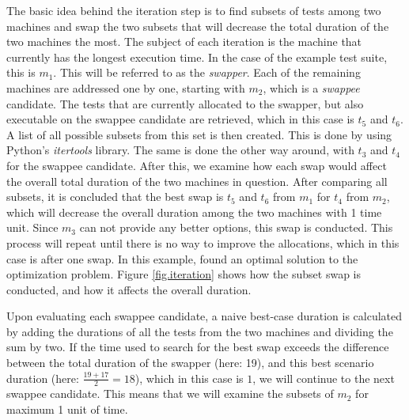 The basic idea behind the iteration step is to find subsets of tests among two machines and swap the two subsets that will decrease the total duration of the two machines the most. The subject of each iteration is the machine that currently has the longest execution time. In the case of the example test suite, this is $m_{1}$. This will be referred to as the \emph{swapper}. Each of the remaining machines are addressed one by one, starting with $m_{2}$, which is a \emph{swappee} candidate. The tests that are currently allocated to the swapper, but also executable on the swappee candidate are retrieved, which in this case is $t_{5}$ and $t_{6}$. A list of all possible subsets from this set is then created. This is done by using Python's \emph{itertools} library. The same is done the other way around, with $t_{3}$ and $t_{4}$ for the swappee candidate. After this, we examine how each swap would affect the overall total duration of the two machines in question. After comparing all subsets, it is concluded that the best swap is $t_{5}$ and $t_{6}$ from $m_{1}$ for $t_{4}$ from $m_{2}$, which will decrease the overall duration among the two machines with 1 time unit. Since $m_{3}$ can not provide any better options, this swap is conducted. This process will repeat until there is no way to improve the allocations, which in this case is after one swap. In this example, \toolname \space found an optimal solution to the optimization problem. Figure \ref{fig.iteration} shows how the subset swap is conducted, and how it affects the overall duration.

Upon evaluating each swappee candidate, a naive best-case duration is calculated by adding the durations of all the tests from the two machines and dividing the sum by two. If the time used to search for the best swap exceeds the difference between the total duration of the swapper (here: 19), and this best scenario duration (here: $\frac{19+17}{2} = 18$), which in this case is $1$, we will continue to the next swappee candidate. This means that we will examine the subsets of $m_{2}$ for maximum 1 unit of time.


